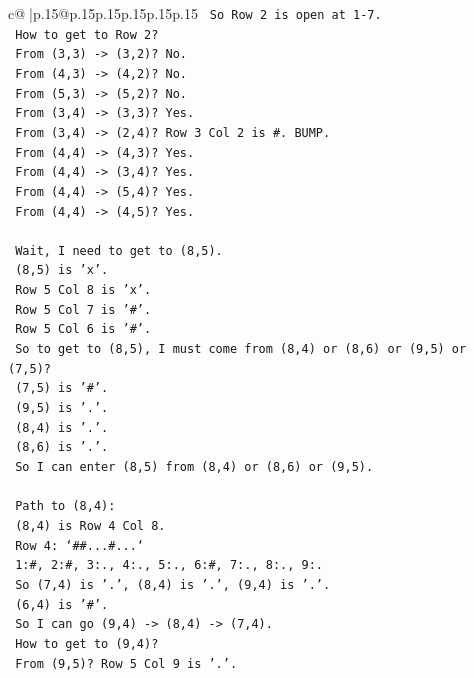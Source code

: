 \documentclass{article}
\begin{document}
{\begin{supertabular}{c@{$\;$}|p{.15\linewidth}@{}p{.15\linewidth}p{.15\linewidth}p{.15\linewidth}p{.15\linewidth}p{.15\linewidth}}
{{{\texttt{   So Row 2 is open at 1{-}7.} \\
\texttt{   How to get to Row 2?} \\
\texttt{   From (3,3) {-}> (3,2)? No.} \\
\texttt{   From (4,3) {-}> (4,2)? No.} \\
\texttt{   From (5,3) {-}> (5,2)? No.} \\
\texttt{   From (3,4) {-}> (3,3)? Yes.} \\
\texttt{   From (3,4) {-}> (2,4)? Row 3 Col 2 is \#. BUMP.} \\
\texttt{   From (4,4) {-}> (4,3)? Yes.} \\
\texttt{   From (4,4) {-}> (3,4)? Yes.} \\
\texttt{   From (4,4) {-}> (5,4)? Yes.} \\
\texttt{   From (4,4) {-}> (4,5)? Yes.} \\
\\ 
\texttt{   Wait, I need to get to (8,5).} \\
\texttt{   (8,5) is 'x'.} \\
\texttt{   Row 5 Col 8 is 'x'.} \\
\texttt{   Row 5 Col 7 is '\#'.} \\
\texttt{   Row 5 Col 6 is '\#'.} \\
\texttt{   So to get to (8,5), I must come from (8,4) or (8,6) or (9,5) or (7,5)?} \\
\texttt{   (7,5) is '\#'.} \\
\texttt{   (9,5) is '.'.} \\
\texttt{   (8,4) is '.'.} \\
\texttt{   (8,6) is '.'.} \\
\texttt{   So I can enter (8,5) from (8,4) or (8,6) or (9,5).} \\
\\ 
\texttt{   Path to (8,4):} \\
\texttt{   (8,4) is Row 4 Col 8.} \\
\texttt{   Row 4: `\#\#...\#...`} \\
\texttt{   1:\#, 2:\#, 3:., 4:., 5:., 6:\#, 7:., 8:., 9:.} \\
\texttt{   So (7,4) is '.', (8,4) is '.', (9,4) is '.'.} \\
\texttt{   (6,4) is '\#'.} \\
\texttt{   So I can go (9,4) {-}> (8,4) {-}> (7,4).} \\
\texttt{   How to get to (9,4)?} \\
\texttt{   From (9,5)? Row 5 Col 9 is '.'.} \\
}}}
\end{supertabular}}
\end{document}
